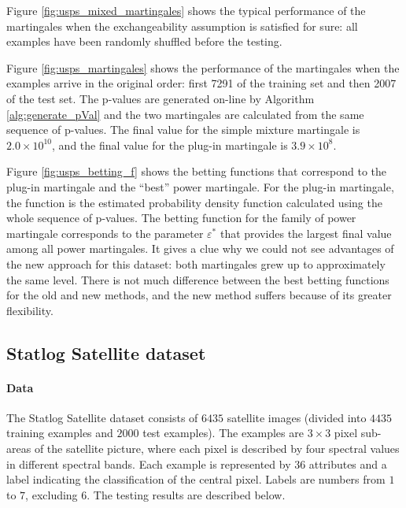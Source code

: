 \documentclass{article}
\theoremstyle{definition}
\begin{document}
Figure \ref{fig:usps_mixed_martingales} shows the typical performance of the martingales
when the exchangeability assumption
is satisfied for sure: all examples have been randomly shuffled before the testing.

Figure \ref{fig:usps_martingales} shows the performance of the martingales when the examples arrive in the original order:
first 7291 of the training set and then 2007 of the test set.
The p-values are generated on-line by Algorithm \ref{alg:generate_pVal}
and the two martingales are calculated from the same sequence of p-values.
The final value for the simple mixture martingale is $2.0\times10^{10}$,
and the final value for the plug-in martingale is $3.9\times10^{8}$.

Figure \ref{fig:usps_betting_f} shows the betting functions
that correspond to the plug-in martingale and the ``best'' power martingale.
For the plug-in martingale, the function is the estimated probability density function
calculated using the whole sequence of p-values.
The betting function for the family of power martingale corresponds to the parameter $\varepsilon^\ast$
that provides the largest final value among all power martingales.
It gives a clue why we could not see advantages of the new approach for this dataset:
both martingales grew up to approximately the same level.
There is not much difference between the best betting functions for the old and new methods,
and the new method suffers because of its greater flexibility.

\subsection{Statlog Satellite dataset}

\paragraph{Data}
The Statlog Satellite dataset \citep{uci} consists of $6435$ satellite images
(divided into $4435$ training examples and $2000$ test examples).
The examples are $3\times3$ pixel sub-areas of the satellite picture, where each
pixel is described by four spectral values in different spectral bands.
Each example is represented by $36$ attributes and a label indicating the classification of the central pixel.
Labels are numbers from $1$ to $7$, excluding $6$.
The testing results are described below.
\end{document}
